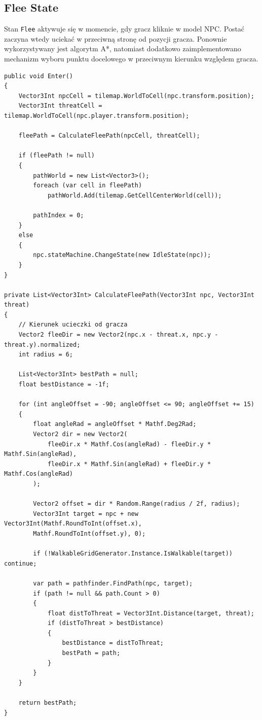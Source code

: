 \documentclass[a4paper,12pt]{book} %
\begin{document}
\subsection*{Flee State}

Stan \texttt{Flee} aktywuje się w momencie, gdy gracz kliknie w model NPC.  
Postać zaczyna wtedy uciekać w przeciwną stronę od pozycji gracza.  
Ponownie wykorzystywany jest algorytm A*, natomiast dodatkowo zaimplementowano mechanizm wyboru punktu docelowego w przeciwnym kierunku względem gracza.  

\begin{lstlisting}[language=CSharp, caption={Implementacja stanu Flee}, label={lst:flee_state}]
public void Enter()
{
    Vector3Int npcCell = tilemap.WorldToCell(npc.transform.position);
    Vector3Int threatCell = tilemap.WorldToCell(npc.player.transform.position);

    fleePath = CalculateFleePath(npcCell, threatCell);

    if (fleePath != null)
    {
        pathWorld = new List<Vector3>();
        foreach (var cell in fleePath)
            pathWorld.Add(tilemap.GetCellCenterWorld(cell));

        pathIndex = 0;
    }
    else
    {
        npc.stateMachine.ChangeState(new IdleState(npc));
    }
}

private List<Vector3Int> CalculateFleePath(Vector3Int npc, Vector3Int threat)
{
    // Kierunek ucieczki od gracza
    Vector2 fleeDir = new Vector2(npc.x - threat.x, npc.y - threat.y).normalized;
    int radius = 6;

    List<Vector3Int> bestPath = null;
    float bestDistance = -1f;

    for (int angleOffset = -90; angleOffset <= 90; angleOffset += 15)
    {
        float angleRad = angleOffset * Mathf.Deg2Rad;
        Vector2 dir = new Vector2(
            fleeDir.x * Mathf.Cos(angleRad) - fleeDir.y * Mathf.Sin(angleRad),
            fleeDir.x * Mathf.Sin(angleRad) + fleeDir.y * Mathf.Cos(angleRad)
        );

        Vector2 offset = dir * Random.Range(radius / 2f, radius);
        Vector3Int target = npc + new Vector3Int(Mathf.RoundToInt(offset.x), 
        Mathf.RoundToInt(offset.y), 0);

        if (!WalkableGridGenerator.Instance.IsWalkable(target)) continue;

        var path = pathfinder.FindPath(npc, target);
        if (path != null && path.Count > 0)
        {
            float distToThreat = Vector3Int.Distance(target, threat);
            if (distToThreat > bestDistance)
            {
                bestDistance = distToThreat;
                bestPath = path;
            }
        }
    }

    return bestPath;
}
\end{lstlisting}
\end{document}
